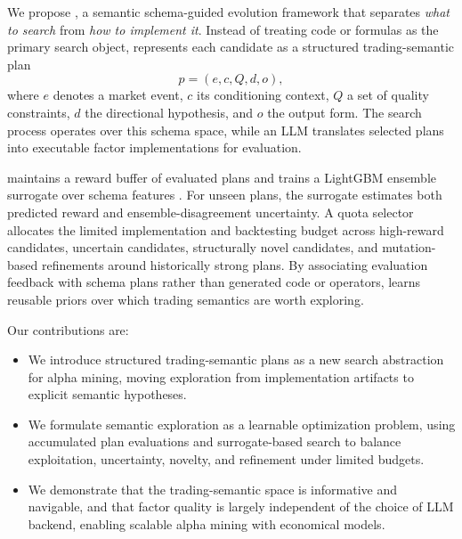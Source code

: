 We propose \method{}, a semantic schema-guided evolution framework that separates \emph{what to search} from \emph{how to implement it}. Instead of treating code or formulas as the primary search object, \method{} represents each candidate as a structured trading-semantic plan
\begin{equation}
p=(e,c,Q,d,o),
\end{equation}
where \(e\) denotes a market event, \(c\) its conditioning context, \(Q\) a set of quality constraints, \(d\) the directional hypothesis, and \(o\) the output form. The search process operates over this schema space, while an LLM translates selected plans into executable factor implementations for evaluation.

\method{} maintains a reward buffer of evaluated plans and trains a LightGBM ensemble surrogate over schema features \cite{ke2017lightgbm}. For unseen plans, the surrogate estimates both predicted reward and ensemble-disagreement uncertainty. A quota selector allocates the limited implementation and backtesting budget across high-reward candidates, uncertain candidates, structurally novel candidates, and mutation-based refinements around historically strong plans. By associating evaluation feedback with schema plans rather than generated code or operators, \method{} learns reusable priors over which trading semantics are worth exploring.

Our contributions are:
\begin{itemize}[leftmargin=12pt]
    \item We introduce structured trading-semantic plans as a new search abstraction for alpha mining, moving exploration from implementation artifacts to explicit semantic hypotheses.
    \item We formulate semantic exploration as a learnable optimization problem, using accumulated plan evaluations and surrogate-based search to balance exploitation, uncertainty, novelty, and refinement under limited budgets.
    \item We demonstrate that the trading-semantic space is informative and navigable, and that factor quality is largely independent of the choice of LLM backend, enabling scalable alpha mining with economical models.
\end{itemize}